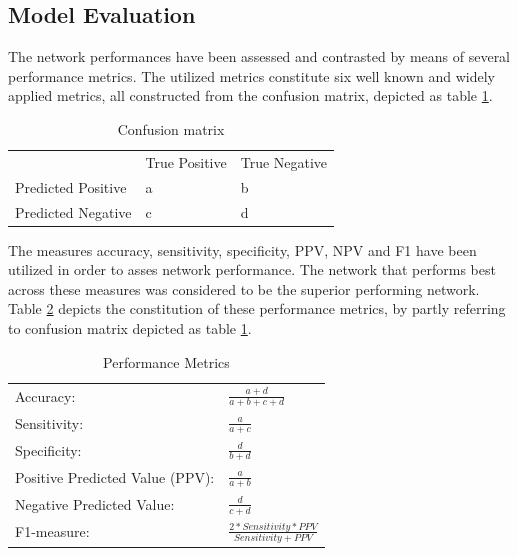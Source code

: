 \documentclass[12pt]{article}
\begin{document}
\clearpage
\subsection{Model Evaluation}
The network performances have been assessed and contrasted by means of several performance metrics. The utilized metrics constitute six well known and widely applied metrics, all constructed from the confusion matrix, depicted as table \ref{table:confusion}.

\bigskip
\bgroup
\def\arraystretch{1.6}%
\begin{table}[h]
\centering
\caption{Confusion matrix}
\label{table:confusion}
\begin{tabular}{lll}
                                        & True Positive          & True Negative          \\ \cline{2-3} 
\multicolumn{1}{l|}{Predicted Positive} & \multicolumn{1}{l|}{a} & \multicolumn{1}{l|}{b} \\ \cline{2-3} 
\multicolumn{1}{l|}{Predicted Negative} & \multicolumn{1}{l|}{c} & \multicolumn{1}{l|}{d} \\ \cline{2-3} 
\end{tabular}
\end{table}
\egroup

The measures accuracy, sensitivity, specificity, PPV, NPV and F1 have been utilized in order to asses network performance. The network that performs best across these measures was considered to be the superior performing network. Table \ref{table:metrics} depicts the constitution of these performance metrics, by partly referring to confusion matrix depicted as table \ref{table:confusion}. 
\bigskip
\bgroup
\def\arraystretch{1.8}%
\begin{table}[h]
\centering
\caption{Performance Metrics}
\label{table:metrics}
\begin{tabular}{ll}
\hline
Accuracy:                       & \(\frac{\!\!\!\!\!\!\!\!\!\!\!\!\!\!a+d}{a+b+c+d}\) \\
Sensitivity:                    & \(\frac{a}{a+c}\)                                   \\
Specificity:                    & \(\frac{d}{b+d}\)                                   \\
Positive Predicted Value (PPV): & \(\frac{a}{a+b}\)                                   \\
Negative Predicted Value:       & \(\frac{d}{c+d}\)                                   \\
F1-measure:                     & \(\frac{2*Sensitivity*PPV}{Sensitivity+PPV}\)       \\ \hline
\end{tabular}
\end{table}
\egroup

\newpage



\end{document}
